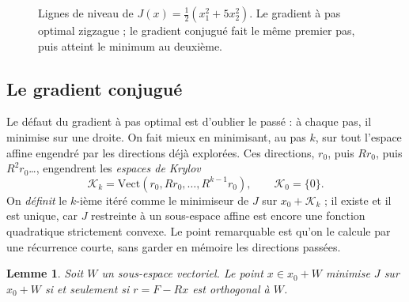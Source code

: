\documentclass[11pt,a4paper]{article}
\theoremstyle{plain}
\newtheorem{lemme}[theoreme]{Lemme}
\theoremstyle{definition}
\theoremstyle{remark}
\newcommand{\K}{\mathcal{K}}
\begin{document}
\begin{figure}[h]
\centering
{}
\caption{Lignes de niveau de $J(x)=\frac12(x_1^2+5x_2^2)$. Le gradient à pas optimal zigzague ; le gradient conjugué fait le même premier pas, puis atteint le minimum au deuxième.}\label{fig:zigzag}
\end{figure}

\subsection{Le gradient conjugué}

Le défaut du gradient à pas optimal est d'oublier le passé : à chaque pas, il minimise sur une droite. On fait mieux en minimisant, au pas $k$, sur tout l'espace affine engendré par les directions déjà explorées. Ces directions, $r_0$, puis $Rr_0$, puis $R^2r_0$\dots, engendrent les \emph{espaces de Krylov}
\[
  \K_k=\mathrm{Vect}(r_0,Rr_0,\dots,R^{k-1}r_0),\qquad \K_0=\{0\}.
\]
On \emph{définit} le $k$-ième itéré comme le minimiseur de $J$ sur $x_0+\K_k$ ; il existe et il est unique, car $J$ restreinte à un sous-espace affine est encore une fonction quadratique strictement convexe. Le point remarquable est qu'on le calcule par une récurrence courte, sans garder en mémoire les directions passées.

\begin{lemme}\label{lem:galerkine}
Soit $W$ un sous-espace vectoriel. Le point $x\in x_0+W$ minimise $J$ sur $x_0+W$ si et seulement si $r=F-Rx$ est orthogonal à $W$.
\end{lemme}
\end{document}

